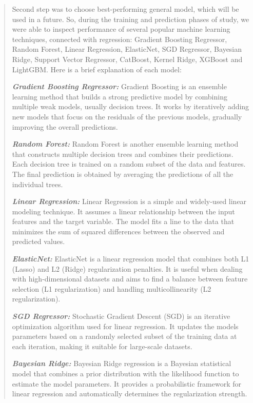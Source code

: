 \begin{quote}
Second step was to choose best-performing general model, which will be
used in a future. So, during the training and prediction phases of
study, we were able to inspect performance of several popular machine
learning techniques, connected with regression: Gradient Boosting
Regressor, Random Forest, Linear Regression, ElasticNet, SGD Regressor,
Bayesian Ridge, Support Vector Regressor, CatBoost, Kernel Ridge,
XGBoost and LightGBM. Here is a brief explanation of each model:

\emph{\textbf{Gradient Boosting Regressor:}} Gradient Boosting is an
ensemble learning method that builds a strong predictive model by
combining multiple weak models, usually decision trees. It works by
iteratively adding new models that focus on the residuals of the
previous models, gradually improving the overall predictions.

\emph{\textbf{Random Forest:}} Random Forest is another ensemble
learning method that constructs multiple decision trees and combines
their predictions. Each decision tree is trained on a random subset of
the data and features. The final prediction is obtained by averaging the
predictions of all the individual trees.

\emph{\textbf{Linear Regression:}} Linear Regression is a simple and
widely-used linear modeling technique. It assumes a linear relationship
between the input features and the target variable. The model fits a
line to the data that minimizes the sum of squared differences between
the observed and predicted values.

\emph{\textbf{ElasticNet:}} ElasticNet is a linear regression model that
combines both L1 (Lasso) and L2 (Ridge) regularization penalties. It is
useful when dealing with high-dimensional datasets and aims to find a
balance between feature selection (L1 regularization) and handling
multicollinearity (L2 regularization).

\emph{\textbf{SGD Regressor:}} Stochastic Gradient Descent (SGD) is an
iterative optimization algorithm used for linear regression. It updates
the model\textquotesingle s parameters based on a randomly selected
subset of the training data at each iteration, making it suitable for
large-scale datasets.

\emph{\textbf{Bayesian Ridge:}} Bayesian Ridge regression is a Bayesian
statistical model that combines a prior distribution with the likelihood
function to estimate the model parameters. It provides a probabilistic
framework for linear regression and automatically determines the
regularization strength.


\end{quote}
